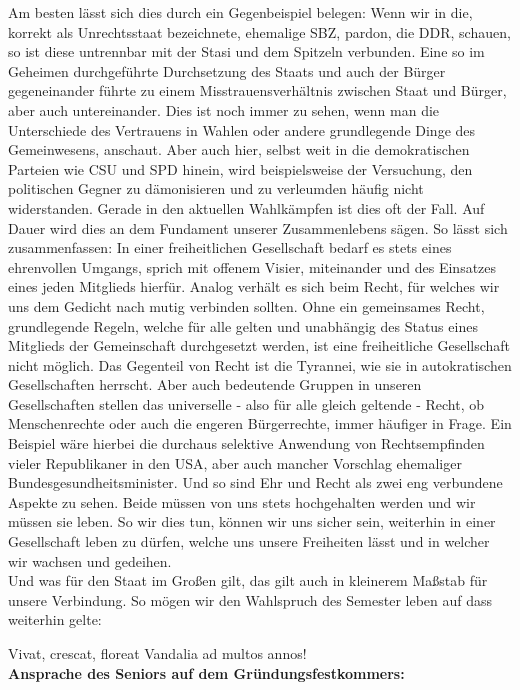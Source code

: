 \begin{multicols}{2}
Am besten lässt sich dies durch ein Gegenbeispiel belegen: Wenn wir in die, korrekt als Unrechtsstaat bezeichnete, ehemalige SBZ, pardon, die DDR, schauen, so ist diese untrennbar mit der Stasi und dem Spitzeln verbunden. Eine so im Geheimen durchgeführte Durchsetzung des Staats und auch der Bürger gegeneinander führte zu einem Misstrauensverhältnis zwischen Staat und Bürger, aber auch untereinander. Dies ist noch immer zu sehen, wenn man die Unterschiede des Vertrauens in Wahlen oder andere grundlegende Dinge des Gemeinwesens, anschaut.
Aber auch hier, selbst weit in die demokratischen Parteien wie CSU und SPD hinein, wird beispielsweise der Versuchung, den politischen Gegner zu dämonisieren und zu verleumden häufig nicht widerstanden. Gerade in den aktuellen Wahlkämpfen ist dies oft der Fall. Auf Dauer wird dies an dem Fundament unserer Zusammenlebens sägen.
So lässt sich zusammenfassen: In einer freiheitlichen Gesellschaft bedarf es stets eines ehrenvollen Umgangs, sprich mit offenem Visier, miteinander und des Einsatzes eines jeden Mitglieds hierfür.
Analog verhält es sich beim Recht, für welches wir uns dem Gedicht nach mutig verbinden sollten. Ohne ein gemeinsames Recht, grundlegende Regeln, welche für alle gelten und unabhängig des Status eines Mitglieds der Gemeinschaft durchgesetzt werden, ist eine freiheitliche Gesellschaft nicht möglich. Das Gegenteil von Recht ist die Tyrannei, wie sie in autokratischen Gesellschaften herrscht.
Aber auch bedeutende Gruppen in unseren Gesellschaften stellen das universelle - also für alle gleich geltende - Recht, ob Menschenrechte oder auch die engeren Bürgerrechte, immer häufiger in Frage. Ein Beispiel wäre hierbei die durchaus selektive Anwendung von Rechtsempfinden vieler Republikaner in den USA, aber auch mancher Vorschlag ehemaliger Bundesgesundheitsminister.
Und so sind Ehr und Recht als zwei eng verbundene Aspekte zu sehen. Beide müssen von uns stets hochgehalten werden und wir müssen sie leben. So wir dies tun, können wir uns sicher sein, weiterhin in einer Gesellschaft leben zu dürfen, welche uns unsere Freiheiten lässt und in welcher wir wachsen und gedeihen.
\\
Und was für den Staat im Großen gilt, das gilt auch in kleinerem Maßstab für unsere Verbindung. So mögen wir den Wahlspruch des Semester leben auf dass weiterhin gelte:

\columnbreak
Vivat, crescat, floreat Vandalia ad multos annos!
\\


\textbf{Ansprache des Seniors auf dem Gründungsfestkommers:}


\end{multicols}
